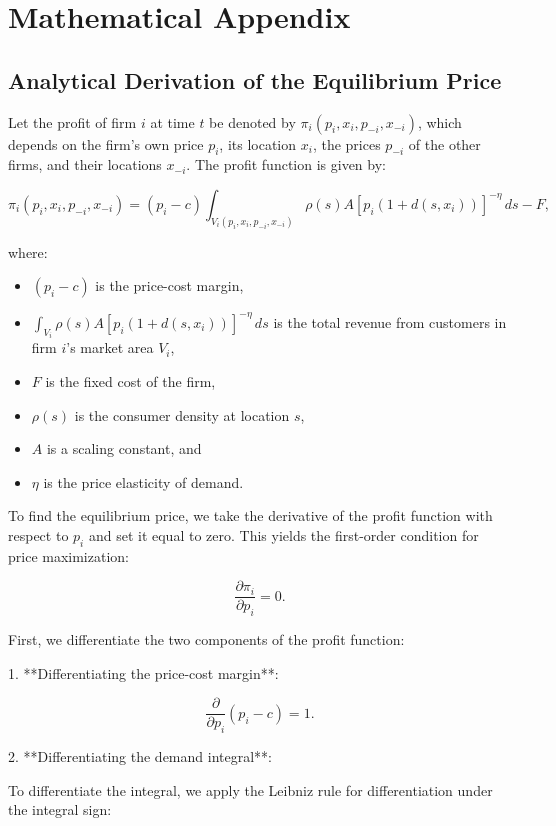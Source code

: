 \section*{Mathematical Appendix}

\subsection*{Analytical Derivation of the Equilibrium Price}

Let the profit of firm \( i \) at time \( t \) be denoted by \( \pi_i(p_i, x_i, p_{-i}, x_{-i}) \), which depends on the firm's own price \( p_i \), its location \( x_i \), the prices \( p_{-i} \) of the other firms, and their locations \( x_{-i} \). The profit function is given by:

\[
\pi_i(p_i, x_i, p_{-i}, x_{-i}) = (p_i - c) \int_{V_i(p_i, x_i, p_{-i}, x_{-i})} \rho(s) A \left[ p_i (1 + d(s, x_i)) \right]^{-\eta} \, ds - F,
\]

where:

\begin{itemize}
    \item \( (p_i - c) \) is the price-cost margin,
    \item \( \int_{V_i} \rho(s) A \left[ p_i (1 + d(s, x_i)) \right]^{-\eta} \, ds \) is the total revenue from customers in firm \( i \)'s market area \( V_i \),
    \item \( F \) is the fixed cost of the firm,
    \item \( \rho(s) \) is the consumer density at location \( s \),
    \item \( A \) is a scaling constant, and
    \item \( \eta \) is the price elasticity of demand.
\end{itemize}

To find the equilibrium price, we take the derivative of the profit function with respect to \( p_i \) and set it equal to zero. This yields the first-order condition for price maximization:

\[
\frac{\partial \pi_i}{\partial p_i} = 0.
\]

First, we differentiate the two components of the profit function:

1. **Differentiating the price-cost margin**:

\[
\frac{\partial}{\partial p_i} (p_i - c) = 1.
\]

2. **Differentiating the demand integral**:

To differentiate the integral, we apply the Leibniz rule for differentiation under the integral sign:

